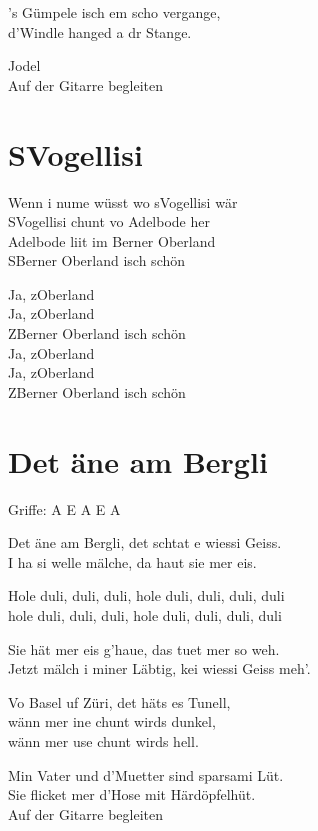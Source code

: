 \documentclass[
  letterpaper,
]{scrbook}
\begin{document}
's Gümpele isch em scho vergange,\\
d'Windle hanged a dr Stange.

Jodel\\
Auf der Gitarre begleiten

\hypertarget{svogellisi}{%
\chapter{S\textquotesingle Vogellisi}\label{svogellisi}}

Wenn i nume wüsst wo s\textquotesingle Vogellisi wär\\
S\textquotesingle Vogellisi chunt vo Adelbode her\\
Adelbode liit im Berner Oberland\\
S\textquotesingle Berner Oberland isch schön

Ja, z\textquotesingle Oberland\\
Ja, z\textquotesingle Oberland\\
Z\textquotesingle Berner Oberland isch schön\\
Ja, z\textquotesingle Oberland\\
Ja, z\textquotesingle Oberland\\
Z\textquotesingle Berner Oberland isch schön

\hypertarget{det-uxe4ne-am-bergli}{%
\chapter{Det äne am Bergli}\label{det-uxe4ne-am-bergli}}

Griffe: A E A E A

Det äne am Bergli, det schtat e wiessi Geiss.\\
I ha si welle mälche, da haut sie mer eis.

Hole duli, duli, duli, hole duli, duli, duli, duli\\
hole duli, duli, duli, hole duli, duli, duli, duli

Sie hät mer eis g'haue, das tuet mer so weh.\\
Jetzt mälch i miner Läbtig, kei wiessi Geiss meh'.

Vo Basel uf Züri, det häts es Tunell,\\
wänn mer ine chunt wirds dunkel,\\
wänn mer use chunt wirds hell.

Min Vater und d'Muetter sind sparsami Lüt.\\
Sie flicket mer d'Hose mit Härdöpfelhüt.\\
Auf der Gitarre begleiten


\backmatter
\end{document}

